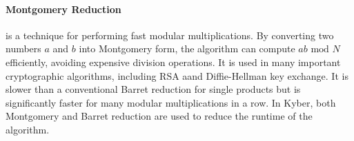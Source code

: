 \paragraph{Montgomery Reduction} is a technique for performing fast modular multiplications. By converting two numbers
$a$ and $b$ into Montgomery form, the algorithm can compute $ab \text{ mod } N$ efficiently, avoiding expensive division
operations. It is used in many important cryptographic algorithms, including RSA aand Diffie-Hellman key exchange. 
It is slower than a conventional Barret reduction for single products but is significantly faster for many 
modular multiplications in a row. In Kyber, both Montgomery and Barret reduction are used to reduce the runtime of the
algorithm.

